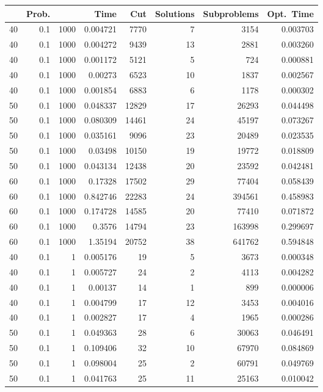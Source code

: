 \documentclass[a4paper,11pt]{article}
\begin{document}
\begin{table}
\begin{center}
\begin{tabular}{|rrr|r|r|rr|r|}
\hline
 & Prob. &  & Time & Cut & Solutions & Subproblems & Opt.\ Time \\
\hline
40 & 0.1 & 1000 & 0.004721 & 7770 & 7 & 3154 & 0.003703 \\
40 & 0.1 & 1000 & 0.004272 & 9439 & 13 & 2881 & 0.003260 \\
40 & 0.1 & 1000 & 0.001172 & 5121 & 5 & 724 & 0.000881 \\
40 & 0.1 & 1000 & 0.00273 & 6523 & 10 & 1837 & 0.002567 \\
40 & 0.1 & 1000 & 0.001854 & 6883 & 6 & 1178 & 0.000302 \\
50 & 0.1 & 1000 & 0.048337 & 12829 & 17 & 26293 & 0.044498 \\
50 & 0.1 & 1000 & 0.080309 & 14461 & 24 & 45197 & 0.073267 \\
50 & 0.1 & 1000 & 0.035161 & 9096 & 23 & 20489 & 0.023535 \\
50 & 0.1 & 1000 & 0.03498 & 10150 & 19 & 19772 & 0.018809 \\
50 & 0.1 & 1000 & 0.043134 & 12438 & 20 & 23592 & 0.042481 \\
60 & 0.1 & 1000 & 0.17328 & 17502 & 29 & 77404 & 0.058439 \\
60 & 0.1 & 1000 & 0.842746 & 22283 & 24 & 394561 & 0.458983 \\
60 & 0.1 & 1000 & 0.174728 & 14585 & 20 & 77410 & 0.071872 \\
60 & 0.1 & 1000 & 0.3576 & 14794 & 23 & 163998 & 0.299697 \\
60 & 0.1 & 1000 & 1.35194 & 20752 & 38 & 641762 & 0.594848 \\
\hline
40 & 0.1 & 1 & 0.005176 & 19 & 5 & 3673 & 0.000348 \\
40 & 0.1 & 1 & 0.005727 & 24 & 2 & 4113 & 0.004282 \\
40 & 0.1 & 1 & 0.00137 & 14 & 1 & 899 & 0.000006 \\
40 & 0.1 & 1 & 0.004799 & 17 & 12 & 3453 & 0.004016 \\
40 & 0.1 & 1 & 0.002827 & 17 & 4 & 1965 & 0.000286 \\
50 & 0.1 & 1 & 0.049363 & 28 & 6 & 30063 & 0.046491 \\
50 & 0.1 & 1 & 0.109406 & 32 & 10 & 67970 & 0.084869 \\
50 & 0.1 & 1 & 0.098004 & 25 & 2 & 60791 & 0.049769 \\
50 & 0.1 & 1 & 0.041763 & 25 & 11 & 25163 & 0.010042 \\

\end{tabular}
\end{center}
\end{table}
\end{document}

